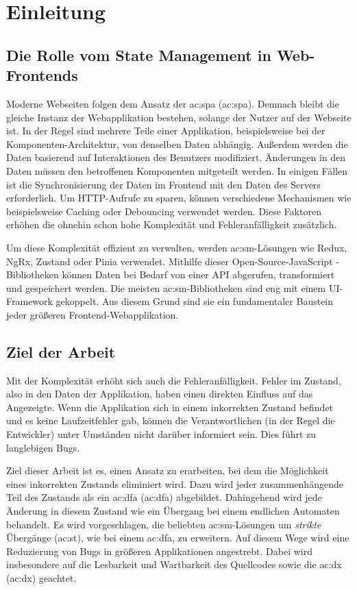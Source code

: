 \chapter{Einleitung}

\section{Die Rolle vom State Management in Web-Frontends}

Moderne Webseiten folgen dem Ansatz der \acrlong{ac:spa} (\acrshort{ac:spa}). Demnach bleibt die gleiche Instanz der Webapplikation bestehen, solange der Nutzer auf der Webseite ist. In der Regel sind mehrere Teile einer Applikation, beispielsweise bei der Komponenten-Architektur, von denselben Daten abhängig. Außerdem werden die Daten basierend auf Interaktionen des Benutzers modifiziert. Änderungen in den Daten müssen den betroffenen Komponenten mitgeteilt werden. In einigen Fällen ist die Synchronisierung der Daten im Frontend mit den Daten des Servers erforderlich. Um HTTP-Aufrufe zu sparen, können verschiedene Mechanismen wie beispielsweise Caching oder Debouncing verwendet werden. Diese Faktoren erhöhen die ohnehin schon hohe Komplexität und Fehleranfälligkeit zusätzlich.

Um diese Komplexität effizient zu verwalten, werden \acrlong{ac:sm}-Lösungen wie Redux, NgRx, Zustand oder Pinia verwendet. Mithilfe dieser Open-Source-JavaScript -Bibliotheken können Daten bei Bedarf von einer API abgerufen, transformiert und gespeichert werden. Die meisten \acrlong{ac:sm}-Bibliotheken sind eng mit einem UI-Framework gekoppelt. Aus diesem Grund sind sie ein fundamentaler Baustein jeder größeren Frontend-Webapplikation.

\section{Ziel der Arbeit}

Mit der Komplexität erhöht sich auch die Fehleranfälligkeit. Fehler im Zustand, also in den Daten der Applikation, haben einen direkten Einfluss auf das Angezeigte. Wenn die Applikation sich in einem inkorrekten Zustand befindet und es keine Laufzeitfehler gab, können die Verantwortlichen (in der Regel die Entwickler) unter Umständen nicht darüber informiert sein. Dies führt zu langlebigen Bugs.

Ziel dieser Arbeit ist es, einen Ansatz zu erarbeiten, bei dem die Möglichkeit eines inkorrekten Zustands eliminiert wird. Dazu wird jeder zusammenhängende Teil des Zustands als ein \acrlong{ac:dfa} (\acrshort{ac:dfa}) abgebildet. Dahingehend wird jede Änderung in diesem Zustand wie ein Übergang bei einem endlichen Automaten behandelt. Es wird vorgeschlagen, die beliebten \acrlong{ac:sm}-Lösungen um \textit{strikte} Übergänge (\acrshort{ac:st}), wie bei einem \acrshort{ac:dfa}, zu erweitern. Auf diesem Wege wird eine Reduzierung von Bugs in größeren Applikationen angestrebt. Dabei wird insbesondere auf die Lesbarkeit und Wartbarkeit des Quellcodes sowie die \acrlong{ac:dx} (\acrshort{ac:dx}) geachtet.

